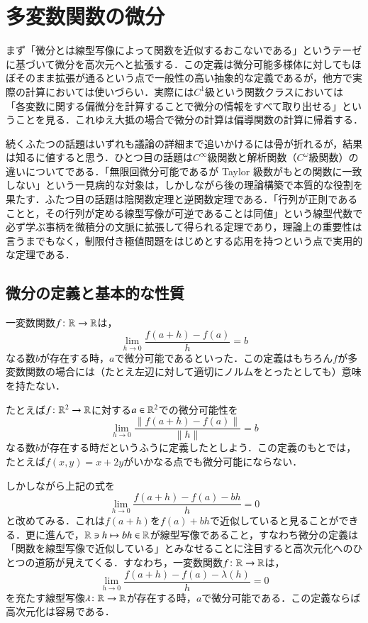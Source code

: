 \section{多変数関数の微分}

まず「微分とは線型写像によって関数を近似するおこないである」というテーゼに基づいて微分を高次元へと拡張する．この定義は微分可能多様体に対してもほぼそのまま拡張が通るという点で一般性の高い抽象的な定義であるが，他方で実際の計算においては使いづらい．実際には$C^1$級という関数クラスにおいては「各変数に関する偏微分を計算することで微分の情報をすべて取り出せる」ということを見る．これゆえ大抵の場合で微分の計算は偏導関数の計算に帰着する．

続くふたつの話題はいずれも議論の詳細まで追いかけるには骨が折れるが，結果は知るに値すると思う．ひとつ目の話題は$C^\infty$級関数と解析関数（$C^\omega$級関数）の違いについてである．「無限回微分可能であるが Taylor 級数がもとの関数に一致しない」という一見病的な対象は，しかしながら後の理論構築で本質的な役割を果たす．ふたつ目の話題は陰関数定理と逆関数定理である．「行列が正則であることと，その行列が定める線型写像が可逆であることは同値」という線型代数で必ず学ぶ事柄を微積分の文脈に拡張して得られる定理であり，理論上の重要性は言うまでもなく，制限付き極値問題をはじめとする応用を持つという点で実用的な定理である．

\subsection{微分の定義と基本的な性質}

一変数関数$f \colon \mathbb{R} \to \mathbb{R}$は，
\begin{equation}
\lim_{h \to 0} \frac{f(a+h) - f(a)}{h} = b
\end{equation}なる数$b$が存在する時，$a$で微分可能であるといった．この定義はもちろん$f$が多変数関数の場合には（たとえ左辺に対して適切にノルムをとったとしても）意味を持たない．

\begin{que}
たとえば$f \colon \mathbb{R}^2 \to \mathbb{R}$に対する$a \in \mathbb{R}^2$での微分可能性を
\begin{equation}
\lim_{h \to 0} \frac{\|f(a+h) - f(a)\|}{\|h\|} = b
\end{equation}なる数$b$が存在する時だというふうに定義したとしよう．この定義のもとでは，たとえば$f(x,y) = x+2y$がいかなる点でも微分可能にならない．
\end{que}

しかしながら上記の式を
\begin{equation}
\lim_{h \to 0} \frac{f(a+h) - f(a) - bh}{h} = 0
\end{equation}と改めてみる．これは$f(a+h)$を$f(a)+bh$で近似していると見ることができる．更に進んで，$\mathbb{R} \ni h \mapsto bh \in \mathbb{R}$が線型写像であること，すなわち微分の定義は「関数を線型写像で近似している」とみなせることに注目すると高次元化へのひとつの道筋が見えてくる．すなわち，一変数関数$f \colon \mathbb{R} \to \mathbb{R}$は，
\begin{equation}
\lim_{h \to 0} \frac{f(a+h) - f(a) - \lambda(h)}{h} = 0
\end{equation}を充たす線型写像$\lambda \colon \mathbb{R} \to \mathbb{R}$が存在する時，$a$で微分可能である．この定義ならば高次元化は容易である．

